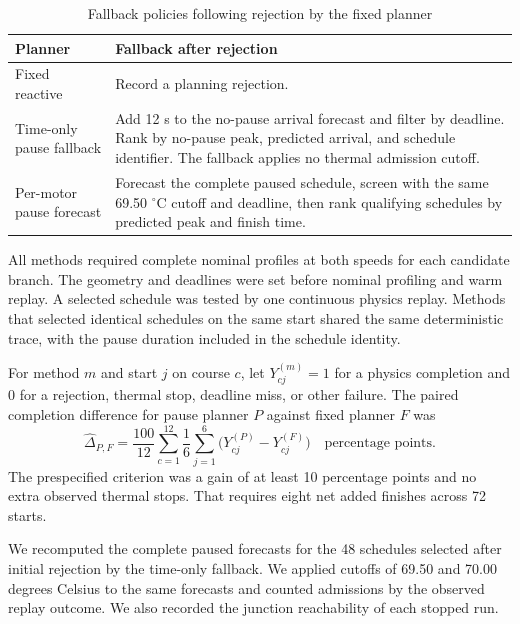 \documentclass{ieeeaccess}
\begin{document}
\begin{table}[!t]
\caption{Fallback policies following rejection by the fixed planner}
\label{tab:methods}
\centering
\footnotesize
\setlength{\tabcolsep}{4pt}
\renewcommand{\arraystretch}{1.18}
\begin{tabularx}{\columnwidth}{@{}>{\raggedright\arraybackslash}p{}>{\raggedright\arraybackslash}X@{}}
\hline
Planner & Fallback after rejection \\
\hline
Fixed reactive & Record a planning rejection. \\
Time-only pause fallback & Add 12 s to the no-pause arrival forecast and filter by deadline. Rank by no-pause peak, predicted arrival, and schedule identifier. The fallback applies no thermal admission cutoff. \\
Per-motor pause forecast & Forecast the complete paused schedule, screen with the same 69.50 \ensuremath{{}^{\circ}\mathrm{C}} cutoff and deadline, then rank qualifying schedules by predicted peak and finish time. \\
\hline
\end{tabularx}
\end{table}


All methods required complete nominal profiles at both speeds for each candidate branch. The geometry and deadlines were set before nominal profiling and warm replay. A selected schedule was tested by one continuous physics replay. Methods that selected identical schedules on the same start shared the same deterministic trace, with the pause duration included in the schedule identity.

For method $m$ and start $j$ on course $c$, let $Y_{cj}^{(m)}=1$ for a physics completion and 0 for a rejection, thermal stop, deadline miss, or other failure. The paired completion difference for pause planner $P$ against fixed planner $F$ was
\begin{equation}
\widehat{\Delta}_{P,F}=\frac{100}{12}\sum_{c=1}^{12}
  \frac{1}{6}\sum_{j=1}^{6}\bigl(Y_{cj}^{(P)}-Y_{cj}^{(F)}\bigr)
  \quad\text{percentage points}.
\end{equation}
The prespecified criterion was a gain of at least 10 percentage points and no extra observed thermal stops. That requires eight net added finishes across 72 starts.

We recomputed the complete paused forecasts for the 48 schedules selected after initial rejection by the time-only fallback. We applied cutoffs of 69.50 and 70.00 degrees Celsius to the same forecasts and counted admissions by the observed replay outcome. We also recorded the junction reachability of each stopped run.
\end{document}
